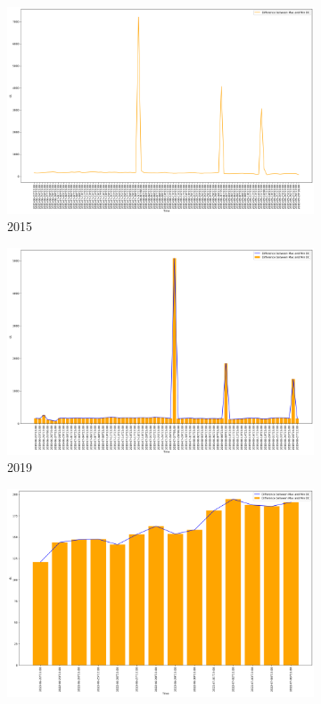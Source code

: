 \begin{figure}[h]
	\centering
	\caption{Daily difference of max and min DC values}
	\begin{subfigure}{0.45\textwidth}
		\centering
		\includegraphics[width=\textwidth]{graphs/2015/byHour/DC_DIFFmaxMin.png}
		\caption{2015}
	\end{subfigure}
	\hfill
	\begin{subfigure}{0.45\textwidth}
		\centering
		\includegraphics[width=\textwidth]{graphs/2019/byHour/DC_DIFFmaxMin.png}
		\caption{2019}
	\end{subfigure}
	\hfill
	\begin{subfigure}{0.45\textwidth}
		\centering
		\includegraphics[width=\textwidth]{graphs/2022/DC_DIFFmaxMin.png}

\end{subfigure}
\end{figure}
